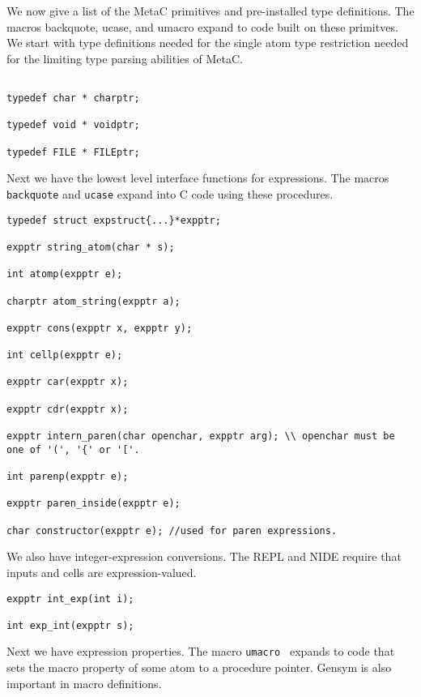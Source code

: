 \documentclass{article}
\begin{document}
We now give a list of the MetaC primitives and pre-installed type definitions.  The macros backquote, ucase, and umacro expand to code built on these primitves.
We start with type definitions needed for the single atom type restriction needed for the limiting type parsing abilities of MetaC.

\begin{verbatim}

typedef char * charptr;

typedef void * voidptr;

typedef FILE * FILEptr;

\end{verbatim}

Next we have the lowest level interface functions for expressions.  The macros {\tt backquote} and {\tt ucase} expand into C code using these procedures.

\begin{verbatim}
typedef struct expstruct{...}*expptr;

expptr string_atom(char * s);

int atomp(expptr e);

charptr atom_string(expptr a);

expptr cons(expptr x, expptr y);

int cellp(expptr e);

expptr car(expptr x);

expptr cdr(expptr x);

expptr intern_paren(char openchar, expptr arg); \\ openchar must be one of '(', '{' or '['.

int parenp(expptr e);

expptr paren_inside(expptr e);

char constructor(expptr e); //used for paren expressions.
\end{verbatim}

We also have integer-expression conversions.  The REPL and NIDE require that inputs and cells are expression-valued.

\begin{verbatim}
expptr int_exp(int i);

int exp_int(expptr s);
\end{verbatim}

Next we have expression properties.  The macro {\tt umacro } expands to code that
sets the macro property of some atom to a procedure pointer.  Gensym is also important
in macro definitions.
\end{document}
